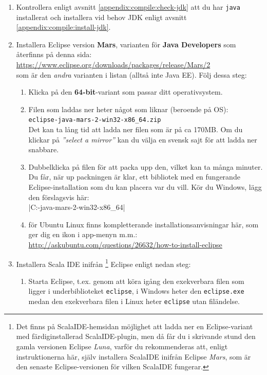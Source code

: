 \begin{enumerate}
\item Kontrollera enligt avsnitt \ref{appendix:compile:check-jdk} att du har \texttt{java} installerat och installera vid behov JDK enligt avsnitt \ref{appendix:compile:install-jdk}.

\item Installera Eclipse version \textbf{Mars}, varianten för \textbf{Java Developers} som återfinns på denna sida: \\ \url{https://www.eclipse.org/downloads/packages/release/Mars/2} \\ som är den \textit{andra} varianten i listan (alltså inte Java EE). Följ dessa steg:
\begin{enumerate}
\item Klicka på den \textbf{64-bit}-variant som passar ditt operativsystem.
\item Filen som laddas ner heter något som liknar (beroende på OS): \\ \texttt{eclipse-java-mars-2-win32-x86\_64.zip} 
\\ Det kan ta lång tid att ladda ner filen som är på ca 170MB. Om du klickar på \textit{''select a mirror''} kan du välja en svensk sajt för att ladda ner snabbare. 

\item Dubbelklicka på filen för att packa upp den, vilket kan ta många minuter. Du får, när up	packningen är klar, ett bibliotek med en fungerande Eclipse-installation som du kan placera var du vill. Kör du Windows, lägg den förslagsvis här:\\ 
\code|C:\eclipse\eclipse-java-mars-2-win32-x86_64|

\item för Ubuntu Linux finns kompletterande installationsanvisningar här, som ger dig en ikon i app-menyn m.m.: 
\\ \url{http://askubuntu.com/questions/26632/how-to-install-eclipse}
\end{enumerate}

\item Installera Scala IDE inifrån%
\footnote{Det finns på ScalaIDE-hemsidan möjlighet att ladda ner en Eclipse-variant med färdiginstallerad ScalaIDE-plugin, men då får du i skrivande stund den gamla versionen Eclipse \textit{Luna}, varför du rekommenderas att, enligt instruktionerna här, själv installera ScalaIDE inifrån Eclipse \textit{Mars}, som är den senaste Eclipse-versionen för vilken ScalaIDE fungerar.}
 Eclipse enligt nedan steg:
\begin{enumerate}
\item Starta Eclipse, t.ex. genom att köra igång den exekverbara filen som ligger i underbiblioteket \texttt{eclipse}, i Windows heter den \texttt{eclipse.exe} medan den exekverbara filen i Linux heter \texttt{eclipse} utan filändelse.


\end{enumerate}
\end{enumerate}
